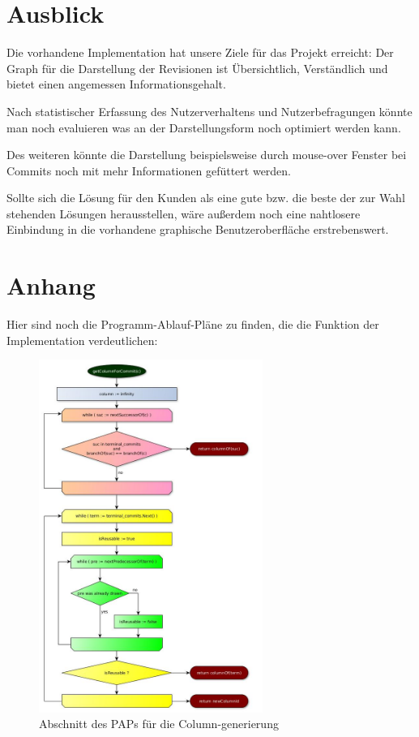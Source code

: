\documentclass[color, ddc]{tudscrreprt}
\begin{document}
\section{Ausblick}

Die vorhandene Implementation hat unsere Ziele für das Projekt erreicht: Der Graph für die Darstellung der Revisionen ist  Übersichtlich, Verständlich und bietet einen angemessen Informationsgehalt.

Nach statistischer Erfassung des Nutzerverhaltens und Nutzerbefragungen könnte man noch evaluieren was an der Darstellungsform noch optimiert werden kann. 

Des weiteren könnte die Darstellung beispielsweise durch mouse-over Fenster bei Commits noch mit mehr Informationen gefüttert werden. 

Sollte sich die Lösung für den Kunden als eine gute bzw. die beste der zur Wahl stehenden Lösungen herausstellen, wäre außerdem noch eine nahtlosere Einbindung in die vorhandene graphische Benutzeroberfläche erstrebenswert.

\section*{Anhang}
Hier sind noch die Programm-Ablauf-Pläne zu finden, die die Funktion der Implementation verdeutlichen:
\begin{figure}[ht!]
\centering
\includegraphics[width=0.65\textwidth]{Skizzen/PAP_getColumnForCommit.jpg}
\caption{Abschnitt des PAPs für die Column-generierung}
\label{pap-column-img}
\end{figure}
\end{document}
